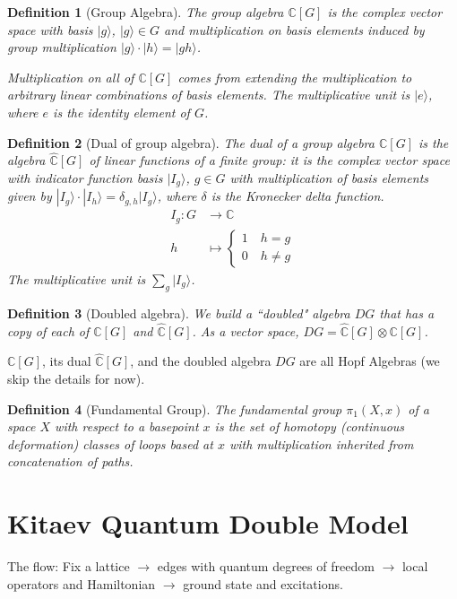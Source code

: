 \documentclass[11pt, a4paper]{article}
\newtheorem{definition}{Definition}[section]
\begin{document}
\begin{definition}[Group Algebra]
    The group algebra $\mathbb{C}[G]$ is the complex vector space with basis $|g\rangle$, $|g\rangle \in G$ and multiplication on basis elements induced by group multiplication $|g\rangle\cdot|h\rangle = |gh\rangle$. 
    
    Multiplication on all of $\mathbb{C}[G]$ comes from extending the multiplication to arbitrary linear combinations of basis elements. The multiplicative unit is $|e\rangle$, where $e$ is the identity element of $G$.
\end{definition}

\begin{definition}[Dual of group algebra]
    The dual of a group algebra $\mathbb{C}[G]$ is the algebra $\hat{\mathbb{C}}[G]$ of linear functions of a finite group: it is the complex vector space with indicator function basis $|I_g\rangle$, $g \in G$ with multiplication of basis elements given by $|I_g\rangle\cdot|I_h\rangle = \delta_
    {g,h}|I_g\rangle$, where $\delta$ is the Kronecker delta function.
    \begin{align*}
        I_g : G &\to \mathbb{C}\\
        h &\mapsto \begin{cases}
        1 \quad h = g\\
        0 \quad h \neq g
        \end{cases}
    \end{align*}
The multiplicative unit is $\sum_g|I_g\rangle$.
\end{definition}

\begin{definition}[Doubled algebra]
    We build a ``doubled" algebra $DG$ that has a copy of each of $\mathbb{C}[G]$ and $\hat{\mathbb{C}}[G]$. As a vector space, $DG = \hat{\mathbb{C}}[G] \otimes \mathbb{C}[G]$.
\end{definition}

$\mathbb{C}[G]$, its dual $\hat{\mathbb{C}}[G]$, and the doubled algebra $DG$ are all Hopf Algebras (we skip the details for now).

\begin{definition}[Fundamental Group]
    The fundamental group $\pi_1(X,x)$ of a space $X$ with respect to a basepoint $x$ is the set of homotopy (continuous deformation) classes of loops based at $x$ with multiplication inherited from concatenation of paths.
\end{definition}

\section{Kitaev Quantum Double Model}
The flow: Fix a lattice $\rightarrow$ edges with quantum degrees of freedom $\rightarrow$ local operators and Hamiltonian $\rightarrow$ ground state and excitations.
\end{document}

